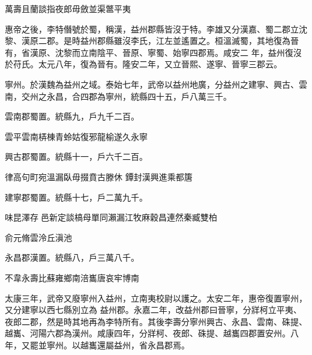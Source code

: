 \begin{pinyinscope}
 萬壽且蘭談指夜郎毋斂並渠鄨平夷



 惠帝之後，李特僭號於蜀，稱漢，益州郡縣皆沒于特。李雄又分漢嘉、蜀二郡立沈黎、漢原二郡。是時益州郡縣雖沒李氏，江左並遙置之。桓溫滅蜀，其地復為晉有，省漢原、沈黎而立南陰平、晉原、寧蜀、始寧四郡焉。咸安二
 年，益州復沒於苻氏。太元八年，復為晉有。隆安二年，又立晉熙、遂寧、晉寧三郡云。



 寧州。於漢魏為益州之域。泰始七年，武帝以益州地廣，分益州之建寧、興古、雲南，交州之永昌，合四郡為寧州，統縣四十五，戶八萬三千。



 雲南郡蜀置。統縣九，戶九千二百。



 雲平雲南梇棟青蛉姑復邪龍榆遂久永寧



 興古郡蜀置。統縣十一，戶六千二百。



 律高句町宛溫漏臥毋掇賁古滕休
 鐔封漢興進乘都篖



 建寧郡蜀置。統縣十七，戶二萬九千。



 味昆澤存邑新定談槁母單同瀨漏江牧麻穀昌連然秦臧雙柏



 俞元脩雲泠丘滇池



 永昌郡漢置。統縣八，戶三萬八千。



 不韋永壽比蘇雍鄉南涪巂唐哀牢博南



 太康三年，武帝又廢寧州入益州，立南夷校尉以護之。太安二年，惠帝復置寧州，又分建寧以西七縣別立為
 益州郡。永嘉二年，改益州郡曰晉寧，分牂柯立平夷、夜郎二郡，然是時其地再為李特所有。其後李壽分寧州興古、永昌、雲南、硃提、越巂、河陽六郡為漢州。咸康四年，分牂柯、夜郎、硃提、越巂四郡置安州。八年，又罷並寧州。以越巂還屬益州，省永昌郡焉。



\end{pinyinscope}